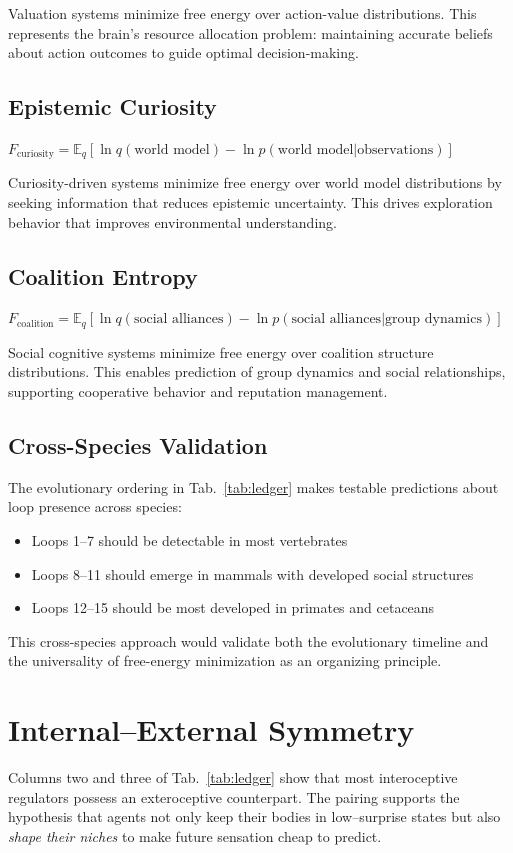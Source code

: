 \documentclass[11pt]{article}
\begin{document}
Valuation systems minimize free energy over action-value distributions. This represents the brain's resource allocation problem: maintaining accurate beliefs about action outcomes to guide optimal decision-making.

\subsection{Epistemic Curiosity}
$F_{\text{curiosity}} = \mathbb{E}_q[\ln q(\text{world model}) - \ln p(\text{world model}|\text{observations})]$

Curiosity-driven systems minimize free energy over world model distributions by seeking information that reduces epistemic uncertainty. This drives exploration behavior that improves environmental understanding.

\subsection{Coalition Entropy}
$F_{\text{coalition}} = \mathbb{E}_q[\ln q(\text{social alliances}) - \ln p(\text{social alliances}|\text{group dynamics})]$

Social cognitive systems minimize free energy over coalition structure distributions. This enables prediction of group dynamics and social relationships, supporting cooperative behavior and reputation management.

\subsection{Cross-Species Validation}
The evolutionary ordering in Tab.~\ref{tab:ledger} makes testable predictions about loop presence across species:
\begin{itemize}
\item Loops 1--7 should be detectable in most vertebrates
\item Loops 8--11 should emerge in mammals with developed social structures  
\item Loops 12--15 should be most developed in primates and cetaceans
\end{itemize}

This cross-species approach would validate both the evolutionary timeline and the universality of free-energy minimization as an organizing principle.

\section{Internal--External Symmetry}
Columns two and three of Tab.~\ref{tab:ledger} show that most interoceptive regulators possess an exteroceptive counterpart.  
The pairing supports the hypothesis that agents not only keep their bodies in low--surprise states 
but also \emph{shape their niches} to make future sensation cheap to predict.
\end{document}
